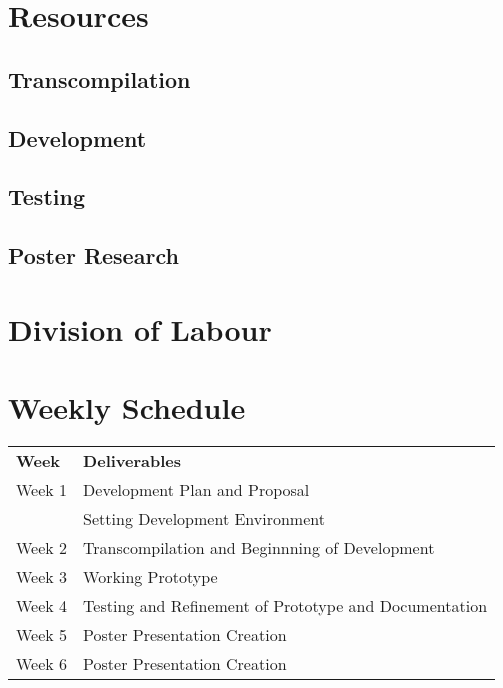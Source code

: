 \documentclass{article}
\begin{document}
\section{Resources}

\subsection{Transcompilation} %

\subsection{Development} %

\subsection{Testing} %

\subsection{Poster Research} %

\section{Division of Labour} %

\section{Weekly Schedule} %

\begin{center}
\begin{tabular}{ l | l }
  \textbf{Week} & \textbf{Deliverables} \\
  \hhline{=|=}
  Week 1 & Development Plan and Proposal\\
         & Setting Development Environment\\ 
  Week 2 & Transcompilation and Beginnning of Development\\
  Week 3 & Working Prototype\\
  Week 4 & Testing and Refinement of Prototype and Documentation\\
  Week 5 & Poster Presentation Creation\\
  Week 6 & Poster Presentation Creation\\
\end{tabular}
\end{center}

\end{document}
